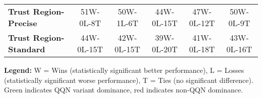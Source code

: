 \begin{table}[htbp]
{\begin{tabular}{lccccc}
\textbf{Trust Region-Precise} & \textcolor{green!70!black}{51W-0L-8T} & \textcolor{green!70!black}{50W-1L-6T} & \textcolor{green!70!black}{44W-0L-15T} & \textcolor{green!70!black}{47W-0L-12T} & \textcolor{green!70!black}{50W-0L-9T} \\
\textbf{Trust Region-Standard} & \textcolor{green!70!black}{44W-0L-15T} & \textcolor{green!70!black}{42W-0L-15T} & \textcolor{green!70!black}{39W-0L-20T} & \textcolor{green!70!black}{41W-0L-18T} & \textcolor{green!70!black}{43W-0L-16T} \\
\bottomrule
\end{tabular}
}
\end{table}
\textbf{Legend:} W = Wins (statistically significant better performance), L = Losses (statistically significant worse performance), T = Ties (no significant difference). Green indicates QQN variant dominance, red indicates non-QQN dominance.
